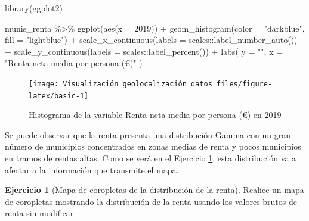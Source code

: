 \documentclass[
]{book}
\newenvironment{Shaded}{\begin{snugshade}}{\end{snugshade}}
\newcommand{\AttributeTok}[1]{\textcolor[rgb]{0.77,0.63,0.00}{#1}}
\newcommand{\FunctionTok}[1]{\textcolor[rgb]{0.00,0.00,0.00}{#1}}
\newcommand{\NormalTok}[1]{#1}
\newcommand{\SpecialCharTok}[1]{\textcolor[rgb]{0.00,0.00,0.00}{#1}}
\newcommand{\StringTok}[1]{\textcolor[rgb]{0.31,0.60,0.02}{#1}}
\theoremstyle{definition}
\theoremstyle{definition}
\theoremstyle{definition}
\newtheorem{exercise}{Ejercicio}[chapter]
\theoremstyle{definition}
\theoremstyle{remark}
\begin{document}
\begin{Shaded}
\begin{Highlighting}[]

\FunctionTok{library}\NormalTok{(ggplot2)}

\NormalTok{munis\_renta }\SpecialCharTok{\%\textgreater{}\%}
  \FunctionTok{ggplot}\NormalTok{(}\FunctionTok{aes}\NormalTok{(}\AttributeTok{x =} \StringTok{\textasciigrave{}}\AttributeTok{2019}\StringTok{\textasciigrave{}}\NormalTok{)) }\SpecialCharTok{+}
  \FunctionTok{geom\_histogram}\NormalTok{(}\AttributeTok{color =} \StringTok{"darkblue"}\NormalTok{, }\AttributeTok{fill =} \StringTok{"lightblue"}\NormalTok{) }\SpecialCharTok{+}
  \FunctionTok{scale\_x\_continuous}\NormalTok{(}\AttributeTok{labels =}\NormalTok{ scales}\SpecialCharTok{::}\FunctionTok{label\_number\_auto}\NormalTok{()) }\SpecialCharTok{+}
  \FunctionTok{scale\_y\_continuous}\NormalTok{(}\AttributeTok{labels =}\NormalTok{ scales}\SpecialCharTok{::}\FunctionTok{label\_percent}\NormalTok{()) }\SpecialCharTok{+}
  \FunctionTok{labs}\NormalTok{(}
    \AttributeTok{y =} \StringTok{""}\NormalTok{,}
    \AttributeTok{x =} \StringTok{"Renta neta media por persona (€)"}
\NormalTok{  )}
\end{Highlighting}
\end{Shaded}

\begin{figure}

{\centering \texttt{[image: Visualización\_geolocalización\_datos\_files/figure-latex/basic-1]} 

}

\caption{Histograma de la variable Renta neta media por persona (€) en 2019}\label{fig:basic}
\end{figure}

Se puede observar que la renta presenta una distribución Gamma con un gran
número de municipios concentrados en zonas medias de renta y pocos municipios en
tramos de rentas altas. Como se verá en el Ejercicio \ref{exr:ex20}, esta
distribución va a afectar a la información que transmite el mapa.

\begin{exercise}[Mapa de coropletas de la distribución de la renta]
\protect\hypertarget{exr:ex20}{}\label{exr:ex20}Realice un mapa de coropletas mostrando la distribución de la renta usando los
valores brutos de renta sin modificar
\end{exercise}
\end{document}
